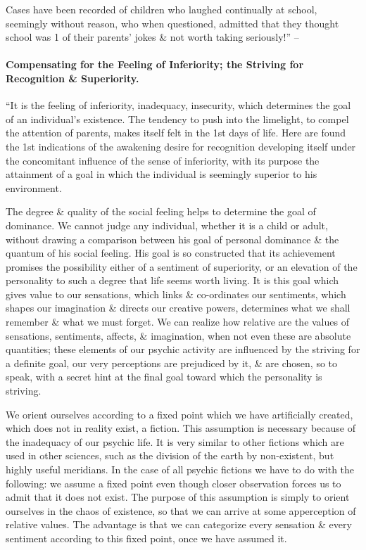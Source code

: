 \documentclass{article}
\begin{document}
Cases have been recorded of children who laughed continually at school, seemingly without reason, who when questioned, admitted that they thought school was 1 of their parents' jokes \& not worth taking seriously!'' -- \cite[pp. 69--71]{Adler_human_nature}

\paragraph{Compensating for the Feeling of Inferiority; the Striving for Recognition \& Superiority.} ``It is the feeling of inferiority, inadequacy, insecurity, which determines the goal of an individual's existence. The tendency to push into the limelight, to compel the attention of parents, makes itself felt in the 1st days of life. Here are found the 1st indications of the awakening desire for recognition developing itself under the concomitant influence of the sense of inferiority, with its purpose the attainment of a goal in which the individual is seemingly superior to his environment.

The degree \& quality of the social feeling helps to determine the goal of dominance. We cannot judge any individual, whether it is a child or adult, without drawing a comparison between his goal of personal dominance \& the quantum of his social feeling. His goal is so constructed that its achievement promises the possibility either of a sentiment of superiority, or an elevation of the personality to such a degree that life seems worth living. It is this goal which gives value to our sensations, which links \& co-ordinates our sentiments, which shapes our imagination \& directs our creative powers, determines what we shall remember \& what we must forget. We can realize how relative are the values of sensations, sentiments, affects, \& imagination, when not even these are absolute quantities; these elements of our psychic activity are influenced by the striving for a definite goal, our very perceptions are prejudiced by it, \& are chosen, so to speak, with a secret hint at the final goal toward which the personality is striving.

We orient ourselves according to a fixed point which we have artificially created, which does not in reality exist, a fiction. This assumption is necessary because of the inadequacy of our psychic life. It is very similar to other fictions which are used in other sciences, such as the division of the earth by non-existent, but highly useful meridians. In the case of all psychic fictions we have to do with the following: we assume a fixed point even though closer observation forces us to admit that it does not exist. The purpose of this assumption is simply to orient ourselves in the chaos of existence, so that we can arrive at some apperception of relative values. The advantage is that we can categorize every sensation \& every sentiment according to this fixed point, once we have assumed it.
\end{document}
